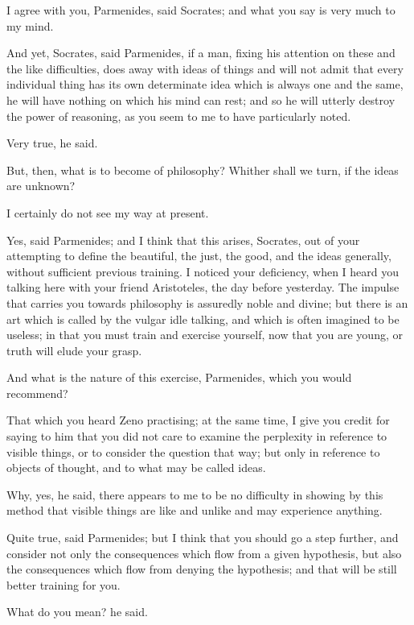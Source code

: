 I agree with you, Parmenides, said Socrates; and what you say is very
much to my mind.

And yet, Socrates, said Parmenides, if a man, fixing his attention on
these and the like difficulties, does away with ideas of things and will
not admit that every individual thing has its own determinate idea which
is always one and the same, he will have nothing on which his mind can
rest; and so he will utterly destroy the power of reasoning, as you seem
to me to have particularly noted.

Very true, he said.

But, then, what is to become of philosophy? Whither shall we turn, if
the ideas are unknown?

I certainly do not see my way at present.

Yes, said Parmenides; and I think that this arises, Socrates, out of
your attempting to define the beautiful, the just, the good, and the
ideas generally, without sufficient previous training. I noticed your
deficiency, when I heard you talking here with your friend Aristoteles,
the day before yesterday. The impulse that carries you towards
philosophy is assuredly noble and divine; but there is an art which is
called by the vulgar idle talking, and which is often imagined to be
useless; in that you must train and exercise yourself, now that you are
young, or truth will elude your grasp.

And what is the nature of this exercise, Parmenides, which you would
recommend?

That which you heard Zeno practising; at the same time, I give you
credit for saying to him that you did not care to examine the perplexity
in reference to visible things, or to consider the question that way;
but only in reference to objects of thought, and to what may be called
ideas.

Why, yes, he said, there appears to me to be no difficulty in showing by
this method that visible things are like and unlike and may experience
anything.

Quite true, said Parmenides; but I think that you should go a step
further, and consider not only the consequences which flow from a
given hypothesis, but also the consequences which flow from denying the
hypothesis; and that will be still better training for you.

What do you mean? he said.

